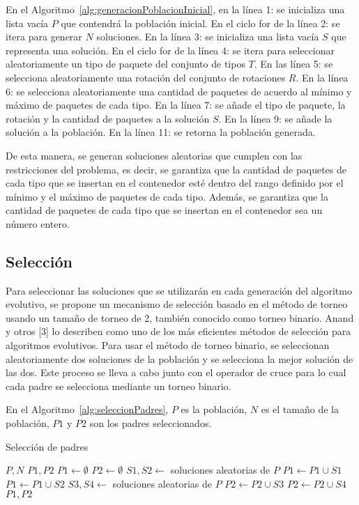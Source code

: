 En el Algoritmo~\ref{alg:generacionPoblacionInicial}, en la línea 1: se inicializa una lista vacía $P$ que contendrá la población inicial. En el ciclo for de la línea 2: se itera para generar $N$ soluciones. En la línea 3: se inicializa una lista vacía $S$ que representa una solución. En el ciclo for de la línea 4: se itera para seleccionar aleatoriamente un tipo de paquete del conjunto de tipos $T$. En las línea 5: se selecciona aleatoriamente una rotación del conjunto de rotaciones $R$. En la línea 6: se selecciona aleatoriamente una cantidad de paquetes de acuerdo al mínimo y máximo de paquetes de cada tipo. En la línea 7: se añade el tipo de paquete, la rotación y la cantidad de paquetes a la solución $S$. En la línea 9: se añade la solución a la población. En la línea 11: se retorna la población generada.

De esta manera, se generan soluciones aleatorias que cumplen con las restricciones del problema, es decir, se garantiza que la cantidad de paquetes de cada tipo que se insertan en el contenedor esté dentro del rango definido por el mínimo y el máximo de paquetes de cada tipo. Además, se garantiza que la cantidad de paquetes de cada tipo que se insertan en el contenedor sea un número entero.

\subsection{Selección}

Para seleccionar las soluciones que se utilizarán en cada generación del algoritmo evolutivo, se propone un mecanismo de selección basado en el método de torneo usando un tamaño de torneo de 2, también conocido como torneo binario. Anand y otros [3] lo describen como uno de los más eficientes métodos de selección para algoritmos evolutivos. Para usar el método de torneo binario, se seleccionan aleatoriamente dos soluciones de la población y se selecciona la mejor solución de las dos. Este proceso se lleva a cabo junto con el operador de cruce para lo cual cada padre se selecciona mediante un torneo binario.

En el Algoritmo~\ref{alg:seleccionPadres}, $P$ es la población, $N$ es el tamaño de la población, $P1$ y $P2$ son los padres seleccionados.

\begin{algorithm}[H]
    \caption{Selección de padres}\label{alg:seleccionPadres}
    \begin{algorithmic}[1]
        \Require $P, N$
        \Ensure $P1, P2$
        \State $P1 \leftarrow \emptyset$
        \State $P2 \leftarrow \emptyset$
        \State $S1, S2 \leftarrow$ soluciones aleatorias de $P$
        \State $P1 \leftarrow P1 \cup S1$
        \Else
        \State $P1 \leftarrow P1 \cup S2$
        \EndIf
        \State $S3, S4 \leftarrow$ soluciones aleatorias de $P$
        \State $P2 \leftarrow P2 \cup S3$
        \Else
        \State $P2 \leftarrow P2 \cup S4$
        \EndIf
        \EndFor
        \State \Return $P1, P2$
    \end{algorithmic}
\end{algorithm}

